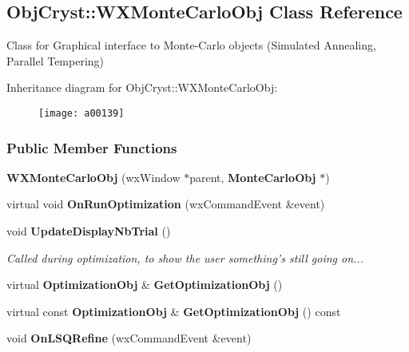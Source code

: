 \subsection{Obj\-Cryst\-:\-:W\-X\-Monte\-Carlo\-Obj Class Reference}
\label{a00139}


Class for Graphical interface to Monte-\/\-Carlo objects (Simulated Annealing, Parallel Tempering)  


Inheritance diagram for Obj\-Cryst\-:\-:W\-X\-Monte\-Carlo\-Obj\-:\begin{figure}[H]
\begin{center}
\leavevmode
\texttt{[image: a00139]}
\end{center}
\end{figure}
\subsubsection*{Public Member Functions}
\begin{DoxyCompactItemize}
\item 
{\bfseries W\-X\-Monte\-Carlo\-Obj} (wx\-Window $\ast$parent, {\bf Monte\-Carlo\-Obj} $\ast$)\label{a00139_a7f065d157d74531110e16c7d8081a95c}

\item 
virtual void {\bfseries On\-Run\-Optimization} (wx\-Command\-Event \&event)\label{a00139_a098a0d500afd4106725f308b4a5938a5}

\item 
void {\bf Update\-Display\-Nb\-Trial} ()\label{a00139_acbceaa3d0ad0a5936d79a4322eca4df3}

\begin{DoxyCompactList}\small\item\em Called during optimization, to show the user something's still going on... \end{DoxyCompactList}\item 
virtual {\bf Optimization\-Obj} \& {\bfseries Get\-Optimization\-Obj} ()\label{a00139_a82f53dc7990c736211df87a47c0104eb}

\item 
virtual const {\bf Optimization\-Obj} \& {\bfseries Get\-Optimization\-Obj} () const \label{a00139_a9d58c53f79b831360d3dc09eb8da5213}

\item 
void {\bfseries On\-L\-S\-Q\-Refine} (wx\-Command\-Event \&event)\label{a00139_aa7c362490aa3761ae1426f2fe111d622}

\end{DoxyCompactItemize}
